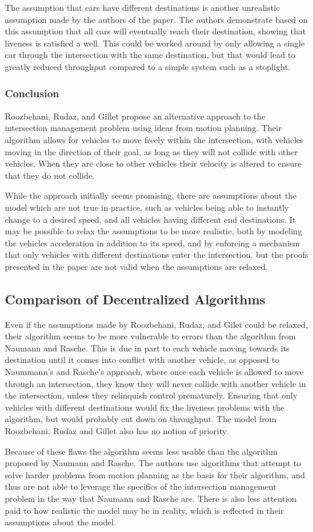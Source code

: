 \documentclass[12pt]{article}
\begin{document}
The assumption that cars have different destinations is another unrealistic assumption made by the authors of the paper. The authors demonstrate based on this assumption that all cars will eventually reach their destination, showing that liveness is satisfied a well. This could be worked around by only allowing a single car through the intersection with the same destination, but that would lead to greatly reduced throughput compared to a simple system such as a stoplight.
\subsubsection{Conclusion}
Roozbehani, Rudaz, and Gillet propose an alternative approach to the intersection management problem using ideas from motion planning. Their algorithm allows for vehicles to move freely within the intersection, with vehicles moving in the direction of their goal, as long as they will not collide with other vehicles. When they are close to other vehicles their velocity is altered to ensure that they do not collide.\par
While the approach initially seems promising, there are assumptions about the model which are not true in practice, such as vehicles being able to instantly change to a desired speed, and all vehicles having different end destinations. It may be possible to relax the assumptions to be more realistic, both by modeling the vehicles acceleration in addition to its speed, and by enforcing a mechanism that only vehicles with different destinations enter the intersection. but the proofs presented in the paper are not valid when the assumptions are relaxed.\par
\subsection{Comparison of Decentralized Algorithms}
Even if the assumptions made by Roozbehani, Rudaz, and Gilet could be relaxed, their algorithm seems to be more vulnerable to errors than the algorithm from Naumann and Rasche. This is due in part to each vehicle moving towards its destination until it comes into conflict with another vehicle, as opposed to Naummann's and Rasche's approach, where once each vehicle is allowed to move through an intersection, they know they will never collide with another vehicle in the intersection, unless they relinquish control prematurely. Ensuring that only vehicles with different destinations would fix the liveness problems with the algorithm, but would probably cut down on throughput. The model from Roozbehani, Rudaz and Gillet also has no notion of priority.\par
Because of these flaws the algorithm seems less usable than the algorithm proposed by Naumann and Rasche. The authors use algorithms that attempt to solve harder problems from motion planning as the basis for their algorithm, and thus are not able to leverage the specifics of the intersection management problem in the way that Naumann and Rasche are. There is also less attention paid to how realistic the model may be in reality, which is reflected in their assumptions about the model.
\end{document}
